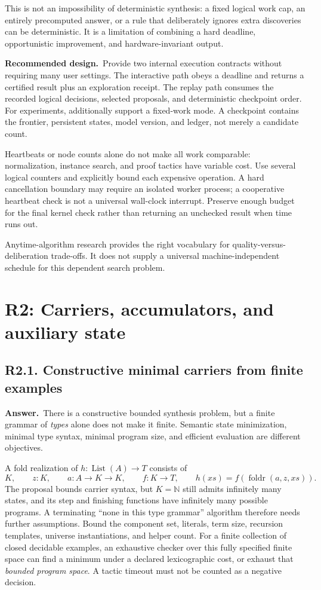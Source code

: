 \documentclass[11pt,a4paper]{article}
\newcommand{\qid}[3]{\subsection{#2. #3}\label{#1}}
\newcommand{\answer}{\noindent\textbf{Answer.}\ }
\newcommand{\proposal}{\noindent\textbf{Recommended design.}\ }
\newcommand{\N}{\mathbb{N}}
\newcommand{\List}{\operatorname{List}}
\newcommand{\fold}{\operatorname{foldr}}
\theoremstyle{remark}
\begin{document}
This is not an impossibility of deterministic synthesis: a fixed logical work cap, an entirely precomputed answer, or a rule that deliberately ignores extra discoveries can be deterministic. It is a limitation of combining a hard deadline, opportunistic improvement, and hardware-invariant output.

\proposal Provide two internal execution contracts without requiring many user settings. The interactive path obeys a deadline and returns a certified result plus an exploration receipt. The replay path consumes the recorded logical decisions, selected proposals, and deterministic checkpoint order. For experiments, additionally support a fixed-work mode. A checkpoint contains the frontier, persistent states, model version, and ledger, not merely a candidate count.

Heartbeats or node counts alone do not make all work comparable: normalization, instance search, and proof tactics have variable cost. Use several logical counters and explicitly bound each expensive operation. A hard cancellation boundary may require an isolated worker process; a cooperative heartbeat check is not a universal wall-clock interrupt. Preserve enough budget for the final kernel check rather than returning an unchecked result when time runs out.

Anytime-algorithm research provides the right vocabulary for quality-versus-deliberation trade-offs. It does not supply a universal machine-independent schedule for this dependent search problem.~\cite{anytime}

\section{R2: Carriers, accumulators, and auxiliary state}\label{sec:r2}

\qid{q21}{R2.1}{Constructive minimal carriers from finite examples}
\answer There is a constructive bounded synthesis problem, but a finite grammar of \emph{types} alone does not make it finite. Semantic state minimization, minimal type syntax, minimal program size, and efficient evaluation are different objectives.

A fold realization of $h:\List(A)\to T$ consists of
\[
 K,\qquad z:K,\qquad a:A\to K\to K,\qquad f:K\to T,
 \qquad h(xs)=f(\fold(a,z,xs)).
\]
The proposal bounds carrier syntax, but $K=\N$ still admits infinitely many states, and its step and finishing functions have infinitely many possible programs. A terminating ``none in this type grammar'' algorithm therefore needs further assumptions. Bound the component set, literals, term size, recursion templates, universe instantiations, and helper count. For a finite collection of closed decidable examples, an exhaustive checker over this fully specified finite space can find a minimum under a declared lexicographic cost, or exhaust that \emph{bounded program space}. A tactic timeout must not be counted as a negative decision.
\end{document}
